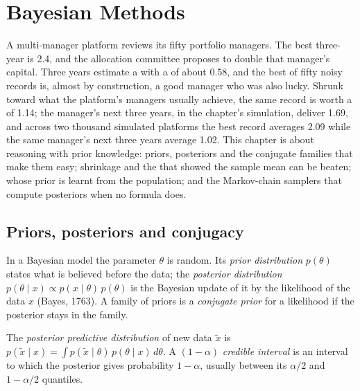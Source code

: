\chapter{Bayesian Methods}\label{ch:qm:bayesian-methods}

A multi-manager platform reviews its fifty portfolio managers. The best three-year  is 2.4, and the allocation committee
proposes to double that manager's capital. Three years estimate a  with a  of about 0.58, and the best of fifty
noisy records is, almost by construction, a good manager who was also lucky. Shrunk toward what the platform's managers usually achieve,
the same record is worth a  of 1.14; the manager's next three years, in the chapter's simulation, deliver 1.69, and across two
thousand simulated platforms the best record averages 2.09 while the same manager's next three years average 1.02. This chapter is about
reasoning with prior knowledge: priors, posteriors and the conjugate families that make them easy; shrinkage and the  that
showed the sample mean can be beaten;  whose prior is learnt from the population; and the Markov-chain samplers that
compute posteriors when no formula does.

\section{Priors, posteriors and conjugacy}

\begin{definition}\label{def:qm:bayesian-methods:prior}
In a Bayesian model the parameter $\theta$ is random. Its \emph{prior distribution} $p(\theta)$ states what is
believed before the data; the \emph{posterior distribution} $p(\theta \mid x) \propto p(x \mid \theta)\,
p(\theta)$ is the Bayesian update of it by the likelihood of the data $x$ (Bayes, 1763). A family of priors is a \emph{conjugate
prior} for a likelihood if the posterior stays in the family.
\end{definition}

\begin{definition}\label{def:qm:bayesian-methods:predictive}
The \emph{posterior predictive distribution} of new data $\tilde x$ is $p(\tilde x \mid x) = \int
p(\tilde x \mid \theta)\,p(\theta \mid x)\,d\theta$. A $(1 - \alpha)$ \emph{credible interval} is an interval to
which the posterior gives probability $1 - \alpha$, usually between its $\alpha/2$ and $1 - \alpha/2$ quantiles.
\end{definition}

